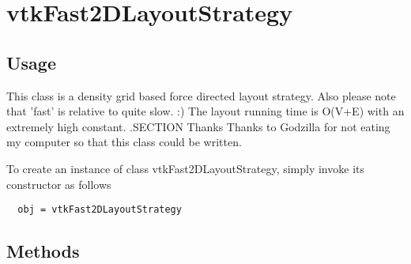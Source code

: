 \section{vtkFast2DLayoutStrategy}

\subsection{Usage}

 This class is a density grid based force directed layout strategy.
 Also please note that 'fast' is relative to quite slow. :)
 The layout running time is O(V+E) with an extremely high constant.
 .SECTION Thanks
 Thanks to Godzilla for not eating my computer so that this class
 could be written.

To create an instance of class vtkFast2DLayoutStrategy, simply
invoke its constructor as follows
\begin{verbatim}
  obj = vtkFast2DLayoutStrategy
\end{verbatim}
\subsection{Methods}

